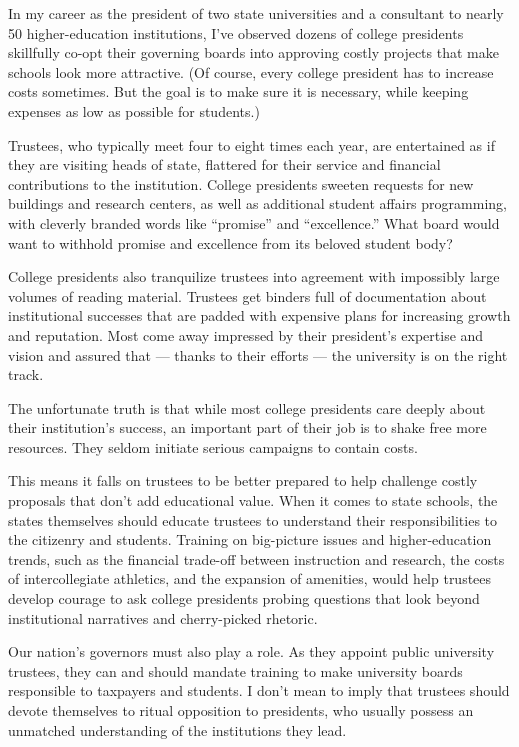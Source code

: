 In my career as the president of two state universities and a consultant
to nearly 50 higher-education institutions, I've observed dozens of
college presidents skillfully co-opt their governing boards into
approving costly projects that make schools look more attractive. (Of
course, every college president has to increase costs sometimes. But the
goal is to make sure it is necessary, while keeping expenses as low as
possible for students.)

Trustees, who typically meet four to eight times each year, are
entertained as if they are visiting heads of state, flattered for their
service and financial contributions to the institution. College
presidents sweeten requests for new buildings and research centers, as
well as additional student affairs programming, with cleverly branded
words like ``promise'' and ``excellence.'' What board would want to
withhold promise and excellence from its beloved student body?

College presidents also tranquilize trustees into agreement with
impossibly large volumes of reading material. Trustees get binders full
of documentation about institutional successes that are padded with
expensive plans for increasing growth and reputation. Most come away
impressed by their president's expertise and vision and assured that ---
thanks to their efforts --- the university is on the right track.

The unfortunate truth is that while most college presidents care deeply
about their institution's success, an important part of their job is to
shake free more resources. They seldom initiate serious campaigns to
contain costs.

This means it falls on trustees to be better prepared to help challenge
costly proposals that don't add educational value. When it comes to
state schools, the states themselves should educate trustees to
understand their responsibilities to the citizenry and students.
Training on big-picture issues and higher-education trends, such as the
financial trade-off between instruction and research, the costs of
intercollegiate athletics, and the expansion of amenities, would help
trustees develop courage to ask college presidents probing questions
that look beyond institutional narratives and cherry-picked rhetoric.

Our nation's governors must also play a role. As they appoint public
university trustees, they can and should mandate training to make
university boards responsible to taxpayers and students. I don't mean to
imply that trustees should devote themselves to ritual opposition to
presidents, who usually possess an unmatched understanding of the
institutions they lead.

